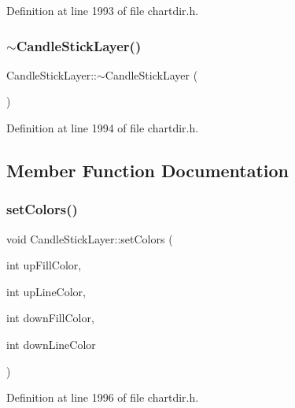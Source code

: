 Definition at line 1993 of file chartdir.\+h.

\mbox{\label{class_candle_stick_layer_a57d641c9ae2201639bdefbc51a4b3a0e}} 
\subsubsection{\texorpdfstring{$\sim$\+Candle\+Stick\+Layer()}{~CandleStickLayer()}}
{\footnotesize\ttfamily Candle\+Stick\+Layer\+::$\sim$\+Candle\+Stick\+Layer (\begin{DoxyParamCaption}{ }\end{DoxyParamCaption})\hspace{0.3cm}{\ttfamily [inline]}}



Definition at line 1994 of file chartdir.\+h.



\subsection{Member Function Documentation}
\mbox{\label{class_candle_stick_layer_a7c5dfc382c750c6c1f358254d3ab7751}} 
\subsubsection{\texorpdfstring{set\+Colors()}{setColors()}}
{\footnotesize\ttfamily void Candle\+Stick\+Layer\+::set\+Colors (\begin{DoxyParamCaption}\item[{int}]{up\+Fill\+Color,  }\item[{int}]{up\+Line\+Color,  }\item[{int}]{down\+Fill\+Color,  }\item[{int}]{down\+Line\+Color }\end{DoxyParamCaption})\hspace{0.3cm}{\ttfamily [inline]}}



Definition at line 1996 of file chartdir.\+h.

